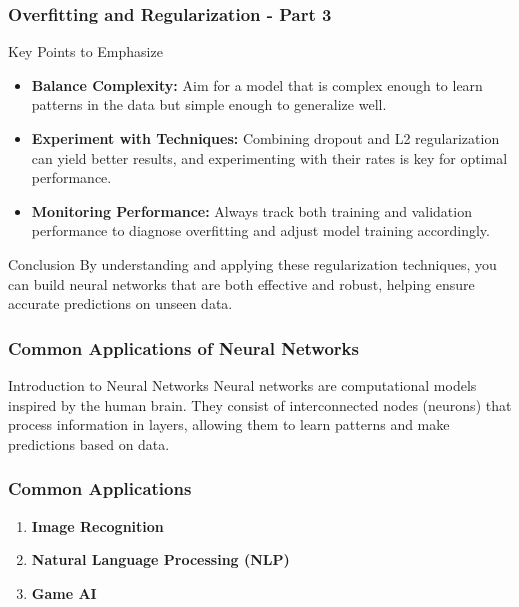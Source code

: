 \documentclass{beamer}
\begin{document}
\begin{frame}[fragile]
    \frametitle{Overfitting and Regularization - Part 3}
    \begin{block}{Key Points to Emphasize}
        \begin{itemize}
            \item \textbf{Balance Complexity:} Aim for a model that is complex enough to learn patterns in the data but simple enough to generalize well.
            \item \textbf{Experiment with Techniques:} Combining dropout and L2 regularization can yield better results, and experimenting with their rates is key for optimal performance.
            \item \textbf{Monitoring Performance:} Always track both training and validation performance to diagnose overfitting and adjust model training accordingly.
        \end{itemize}
    \end{block}

    \begin{block}{Conclusion}
        By understanding and applying these regularization techniques, you can build neural networks that are both effective and robust, helping ensure accurate predictions on unseen data.
    \end{block}
\end{frame}

\begin{frame}
    \frametitle{Common Applications of Neural Networks}
    \begin{block}{Introduction to Neural Networks}
        Neural networks are computational models inspired by the human brain. They consist of interconnected nodes (neurons) that process information in layers, allowing them to learn patterns and make predictions based on data.
    \end{block}
\end{frame}

\begin{frame}
    \frametitle{Common Applications}
    \begin{enumerate}
        \item \textbf{Image Recognition}
        \item \textbf{Natural Language Processing (NLP)}
        \item \textbf{Game AI}
    \end{enumerate}
\end{frame}
\end{document}
